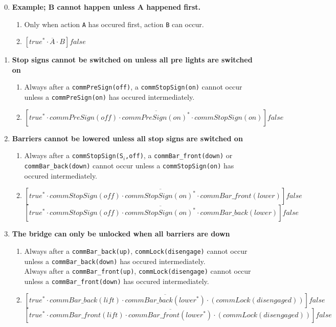 \begin{enumerate}
  \setcounter{enumi}{-1}


  \item \textbf{Example; B cannot happen unless A happened first.}
  \begin{enumerate}
		\item Only when action \texttt{A} has occured first, action \texttt{B} can occur.
		\item $[true^* \cdot \overline{A} \cdot B]false$
	\end{enumerate}

	\item \textbf{Stop signs cannot be switched on unless all pre lights are switched on}
	\begin{enumerate}
		\item Always after a \texttt{commPreSign(off)}, a \texttt{commStopSign(on)} cannot occur unless a \texttt{commPreSign(on)} has occured intermediately.
		\item $[true^* \cdot commPreSign(off) \cdot \overline{commPreSign(on)^{*}} \cdot commStopSign(on)]false$
	\end{enumerate}

	\item \textbf{Barriers cannot be lowered unless all stop signs are switched on}
	\begin{enumerate}
		\item Always after a \texttt{commStopSign(S$_i$,off)}, a \texttt{commBar\_front(down)} or \texttt{commBar\_back(down)} cannot occur unless a \texttt{commStopSign(on)} has occured intermediately.
		\item $[true^* \cdot commStopSign(off) \cdot \overline{commStopSign(on)^{*}} \cdot commBar\_front(lower)]false$ \\
					$[true^* \cdot commStopSign(off) \cdot \overline{commStopSign(on)^{*}} \cdot commBar\_back(lower)]false$ \\
	\end{enumerate}

	\item \textbf{The bridge can only be unlocked when all barriers are down}
	\begin{enumerate}
		\item Always after a \texttt{commBar\_back(up)}, \texttt{commLock(disengage)} cannot occur unless a \texttt{commBar\_back(down)} has occured intermediately. \\
					Always after a \texttt{commBar\_front(up)}, \texttt{commLock(disengage)} cannot occur unless a \texttt{commBar\_front(down)} has occured intermediately.
		\item $[true^* \cdot commBar\_back(lift) \cdot \overline{commBar\_back(lower^{*})} \cdot (commLock(disengaged))]false$
					$[true^* \cdot commBar\_front(lift) \cdot \overline{commBar\_front(lower^{*})} \cdot (commLock(disengaged))]false$
	\end{enumerate}


\end{enumerate}
